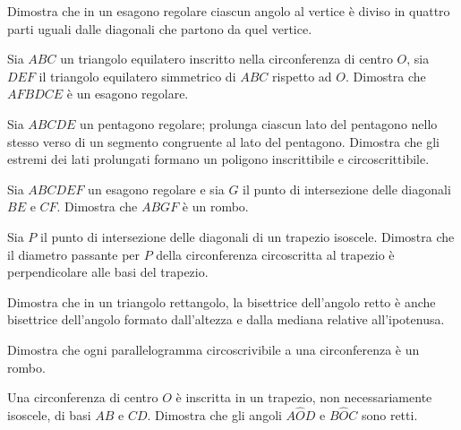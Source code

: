 \begin{esercizio}
\label{ese:5.46}
Dimostra che in un esagono regolare ciascun angolo al vertice è 
diviso in quattro parti uguali dalle diagonali che partono da quel 
vertice.
\end{esercizio}

\begin{esercizio}
\label{ese:5.47}
Sia \(ABC\) un triangolo equilatero inscritto nella circonferenza di 
centro \(O\), sia \(DEF\) il triangolo equilatero simmetrico di \(ABC\) 
rispetto ad \(O\). Dimostra che \(AFBDCE\) è un esagono regolare.
\end{esercizio}

\begin{esercizio}
\label{ese:5.48}
Sia \(ABCDE\) un pentagono regolare; prolunga ciascun lato del 
pentagono nello stesso verso di un segmento congruente al lato del 
pentagono. Dimostra che gli estremi dei lati prolungati formano un 
poligono inscrittibile e circoscrittibile.
\end{esercizio}

\begin{esercizio}
\label{ese:5.49}
Sia \(ABCDEF\) un esagono regolare e sia \(G\) il punto di intersezione 
delle diagonali \(BE\) e \(CF\). Dimostra che \(ABGF\) è un rombo.
\end{esercizio}

\begin{esercizio}
\label{ese:5.50}
Sia \(P\) il punto di intersezione delle diagonali di un trapezio 
isoscele. Dimostra che il diametro passante per \(P\) della 
circonferenza circoscritta al trapezio è perpendicolare alle basi del 
trapezio.
\end{esercizio}

\begin{esercizio}
\label{ese:5.51}
Dimostra che in un triangolo rettangolo, la bisettrice dell'angolo 
retto è anche bisettrice dell'angolo formato dall'altezza e dalla 
mediana relative all'ipotenusa.
\end{esercizio}

\begin{esercizio}
\label{ese:5.52}
Dimostra che ogni parallelogramma circoscrivibile a una circonferenza 
è un rombo.
\end{esercizio}

\begin{esercizio}
\label{ese:5.53}
Una circonferenza di centro \(O\) è inscritta in un trapezio, non 
necessariamente isoscele, di basi \(AB\) e \(CD\). Dimostra che gli 
angoli \(A\widehat{O}D\) e \(B\widehat{O}C\) sono retti.
\end{esercizio}

